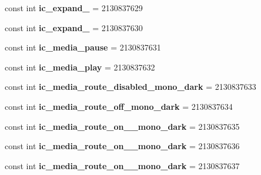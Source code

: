 \begin{DoxyCompactItemize}
const int {\bfseries ic\+\_\+expand\+\_} = 2130837629
\item 
\mbox{\label{classXaria_1_1Resource_1_1Drawable_a12979f11b44d7171e62660b2700f5987}} 
const int {\bfseries ic\+\_\+expand\+\_} = 2130837630
\item 
\mbox{\label{classXaria_1_1Resource_1_1Drawable_af50e61d856f6d7be1239d501461de196}} 
const int {\bfseries ic\+\_\+media\+\_\+pause} = 2130837631
\item 
\mbox{\label{classXaria_1_1Resource_1_1Drawable_a41e6b74923ba0b7a97b5ec865bdb9899}} 
const int {\bfseries ic\+\_\+media\+\_\+play} = 2130837632
\item 
\mbox{\label{classXaria_1_1Resource_1_1Drawable_af4cd972e683d0d00defc663ba544c43d}} 
const int {\bfseries ic\+\_\+media\+\_\+route\+\_\+disabled\+\_\+mono\+\_\+dark} = 2130837633
\item 
\mbox{\label{classXaria_1_1Resource_1_1Drawable_ab0b240dc703ac36699e572a2c414022d}} 
const int {\bfseries ic\+\_\+media\+\_\+route\+\_\+off\+\_\+mono\+\_\+dark} = 2130837634
\item 
\mbox{\label{classXaria_1_1Resource_1_1Drawable_a81ff686c8337da5d0162c8aaa6e01dff}} 
const int {\bfseries ic\+\_\+media\+\_\+route\+\_\+on\+\_\+\_\+mono\+\_\+dark} = 2130837635
\item 
\mbox{\label{classXaria_1_1Resource_1_1Drawable_ac8cbc0311fe64b904afde6388ba490ae}} 
const int {\bfseries ic\+\_\+media\+\_\+route\+\_\+on\+\_\+\_\+mono\+\_\+dark} = 2130837636
\item 
\mbox{\label{classXaria_1_1Resource_1_1Drawable_ac1d1c6263cb232bacc636480811e845e}} 
const int {\bfseries ic\+\_\+media\+\_\+route\+\_\+on\+\_\+\_\+mono\+\_\+dark} = 2130837637
\item 
\mbox{\label{classXaria_1_1Resource_1_1Drawable_ac8eee31c054c81186f1bdbb6bcabbc91}} 

\end{DoxyCompactItemize}
